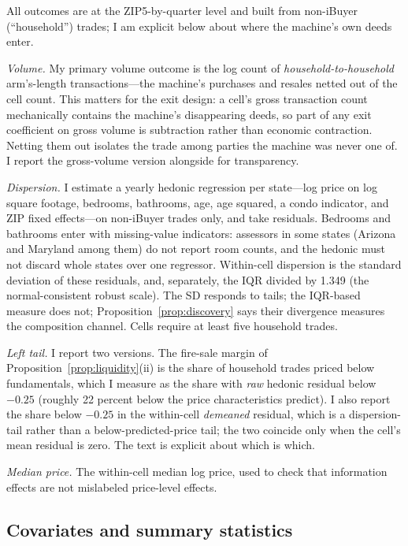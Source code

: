 \documentclass[12pt, letterpaper]{article}
\theoremstyle{remark}
\begin{document}
All outcomes are at the ZIP5-by-quarter level and built from non-iBuyer (``household'') trades; I am explicit below about where the machine's own deeds enter.

\emph{Volume.} My primary volume outcome is the log count of \emph{household-to-household} arm's-length transactions---the machine's purchases and resales netted out of the cell count. This matters for the exit design: a cell's gross transaction count mechanically contains the machine's disappearing deeds, so part of any exit coefficient on gross volume is subtraction rather than economic contraction. Netting them out isolates the trade among parties the machine was never one of. I report the gross-volume version alongside for transparency.

\emph{Dispersion.} I estimate a yearly hedonic regression per state---log price on log square footage, bedrooms, bathrooms, age, age squared, a condo indicator, and ZIP fixed effects---on non-iBuyer trades only, and take residuals. Bedrooms and bathrooms enter with missing-value indicators: assessors in some states (Arizona and Maryland among them) do not report room counts, and the hedonic must not discard whole states over one regressor. Within-cell dispersion is the standard deviation of these residuals, and, separately, the IQR divided by 1.349 (the normal-consistent robust scale). The SD responds to tails; the IQR-based measure does not; Proposition~\ref{prop:discovery} says their divergence measures the composition channel. Cells require at least five household trades.

\emph{Left tail.} I report two versions. The fire-sale margin of Proposition~\ref{prop:liquidity}(ii) is the share of household trades priced below fundamentals, which I measure as the share with \emph{raw} hedonic residual below $-0.25$ (roughly 22 percent below the price characteristics predict). I also report the share below $-0.25$ in the within-cell \emph{demeaned} residual, which is a dispersion-tail rather than a below-predicted-price tail; the two coincide only when the cell's mean residual is zero. The text is explicit about which is which.

\emph{Median price.} The within-cell median log price, used to check that information effects are not mislabeled price-level effects.

\subsection{Covariates and summary statistics}\label{sec:data-covariates}
\end{document}
